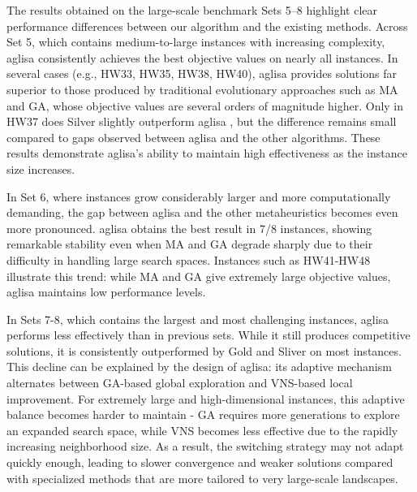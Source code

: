 \documentclass[preprint,12pt]{elsarticle}
\begin{document}
The results obtained on the large-scale benchmark Sets 5–8 highlight clear performance differences between our algorithm and the existing methods. 
Across Set 5, which contains medium-to-large instances with increasing complexity, \gls{aglisa} consistently achieves the best objective values on nearly all instances. In several cases (e.g., HW33, HW35, HW38, HW40), \gls{aglisa} provides solutions far superior to those produced by traditional evolutionary approaches such as MA and GA, whose objective values are several orders of magnitude higher. Only in HW37 does Silver slightly outperform \gls{aglisa} , but the difference remains small compared to gaps observed between \gls{aglisa} and the other algorithms. These results demonstrate \gls{aglisa}'s ability to maintain high effectiveness as the instance size increases.

In Set 6, where instances grow considerably larger and more computationally demanding, the gap between \gls{aglisa} and the other metaheuristics becomes even more pronounced. \gls{aglisa} obtains the best result in 7/8 instances, showing remarkable stability even when MA and GA degrade sharply due to their difficulty in handling large search spaces. Instances such as HW41-HW48 illustrate this trend: while MA and GA give extremely large objective values, \gls{aglisa} maintains low performance levels.

In Sets 7-8, which contains the largest and most challenging instances, \gls{aglisa} performs less effectively than in previous sets. While it still produces competitive solutions, it is consistently outperformed by Gold and Sliver on most instances. This decline can be explained by the design of \gls{aglisa}: its adaptive mechanism alternates between GA-based global exploration and VNS-based local improvement. For extremely large and high-dimensional instances, this adaptive balance becomes harder to maintain - GA requires more generations to explore an expanded search space, while VNS becomes less effective due to the rapidly increasing neighborhood size. As a result, the switching strategy may not adapt quickly enough, leading to slower convergence and weaker solutions compared with specialized methods that are more tailored to very large-scale landscapes.
\end{document}
